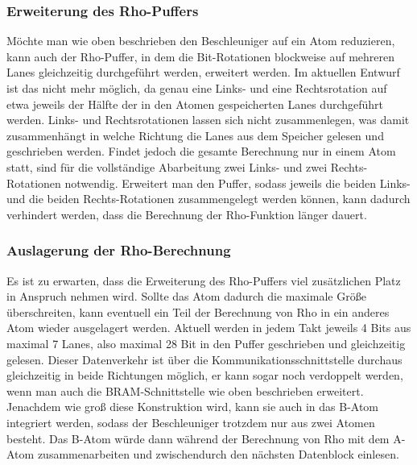 \subsubsection{Erweiterung des Rho-Puffers}
Möchte man wie oben beschrieben den Beschleuniger auf ein Atom reduzieren, kann auch der Rho-Puffer,
in dem die Bit-Rotationen blockweise auf mehreren Lanes gleichzeitig durchgeführt werden, erweitert werden.
Im aktuellen Entwurf ist das nicht mehr möglich, da genau eine Links- und eine Rechtsrotation auf
etwa jeweils der Hälfte der in den Atomen gespeicherten Lanes durchgeführt werden.
Links- und Rechtsrotationen lassen sich nicht zusammenlegen, was damit zusammenhängt in welche
Richtung die Lanes aus dem Speicher gelesen und geschrieben werden.
Findet jedoch die gesamte Berechnung nur in einem Atom statt, sind für die vollständige Abarbeitung
zwei Links- und zwei Rechts-Rotationen notwendig. Erweitert man den Puffer, sodass jeweils die beiden Links- und die beiden Rechts-Rotationen
zusammengelegt werden können, kann dadurch verhindert werden, dass die Berechnung der Rho-Funktion länger dauert.

\subsubsection{Auslagerung der Rho-Berechnung}
Es ist zu erwarten, dass die Erweiterung des Rho-Puffers viel zusätzlichen Platz in Anspruch nehmen wird.
Sollte das Atom dadurch die maximale Größe überschreiten, kann eventuell ein Teil der Berechnung von Rho in ein anderes Atom wieder ausgelagert werden.
Aktuell werden in jedem Takt jeweils 4 Bits aus maximal 7 Lanes, also maximal 28 Bit in den Puffer geschrieben und gleichzeitig gelesen.
Dieser Datenverkehr ist über die Kommunikationsschnittstelle durchaus gleichzeitig in beide Richtungen möglich, er kann sogar noch verdoppelt werden,
wenn man auch die BRAM-Schnittstelle wie oben beschrieben erweitert. Jenachdem wie groß diese Konstruktion wird, kann sie auch in das B-Atom integriert werden,
sodass der Beschleuniger trotzdem nur aus zwei Atomen besteht. Das B-Atom würde dann während der Berechnung von Rho mit dem A-Atom zusammenarbeiten und
zwischendurch den nächsten Datenblock einlesen.

